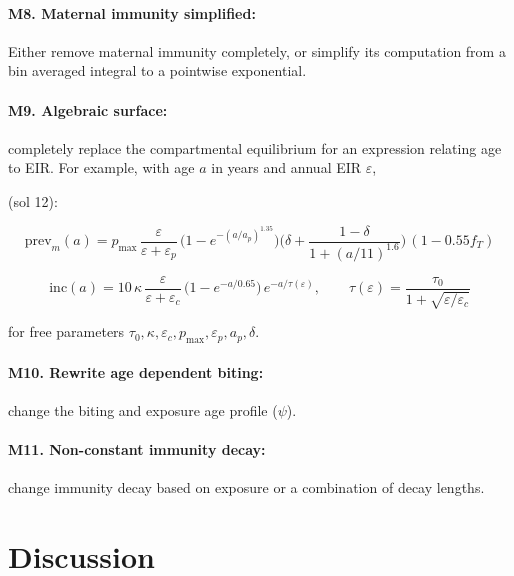 \documentclass[11pt]{article}
\begin{document}
\paragraph{M8. Maternal immunity simplified:} Either remove maternal immunity completely, or simplify its computation from a bin averaged integral to a pointwise exponential.

\paragraph{M9. Algebraic surface:} completely replace the compartmental equilibrium for an expression relating age to EIR. For example, with age $a$ in years and annual EIR $\varepsilon$,

(sol 12):

$$\mathrm{prev}_m(a) = p_{\max}\,\frac{\varepsilon}{\varepsilon + \varepsilon_p}\,\Big(1 - e^{-(a/a_p)^{1.35}}\Big)\Big(\delta + \frac{1-\delta}{1+(a/11)^{1.6}}\Big)\,(1 - 0.55 f_T)$$

$$\mathrm{inc}(a) = 10\,\kappa\,\frac{\varepsilon}{\varepsilon + \varepsilon_c}\,\big(1 - e^{-a/0.65}\big)\,e^{-a/\tau(\varepsilon)}, \qquad \tau(\varepsilon) = \frac{\tau_0}{1 + \sqrt{\varepsilon/\varepsilon_c}}$$

for free parameters $\tau_0, \kappa, \varepsilon_c, p_{\max}, \varepsilon_p, a_p, \delta$.

\paragraph{M10. Rewrite age dependent biting:} change the biting and exposure age profile ($\psi$).

\paragraph{M11. Non-constant immunity decay:} change immunity decay based on exposure or a combination of decay lengths.

\section{Discussion}
\end{document}
